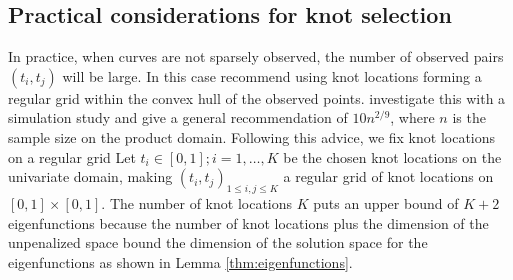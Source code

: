 \subsection{Practical considerations for knot selection} %
\label{sub:practical_considerations_for_knot_selection}

In practice, when curves are not sparsely observed, the number of observed pairs $(t_i, t_j)$ will be large. In this case \cite{CFZ} recommend using knot locations forming a regular grid within the convex hull of the observed points. \cite{Kim:2004tt} investigate this with a simulation study and give a general recommendation of $10n^{2/9}$, where $n$ is the sample size on the product domain. Following this advice, we fix knot locations on a regular grid Let $t_i \in [0,1]; i=1,\dots, K$ be the chosen knot locations on the univariate domain, making $(t_i,t_j)_{1\leq i,j \leq K}$ a regular grid of knot locations on $[0,1]\times[0,1]$. The number of knot locations $K$ puts an upper bound of $K+2$ eigenfunctions because the number of knot locations plus the dimension of the unpenalized space bound the dimension of the solution space for the eigenfunctions as shown in Lemma \ref{thm:eigenfunctions}.

